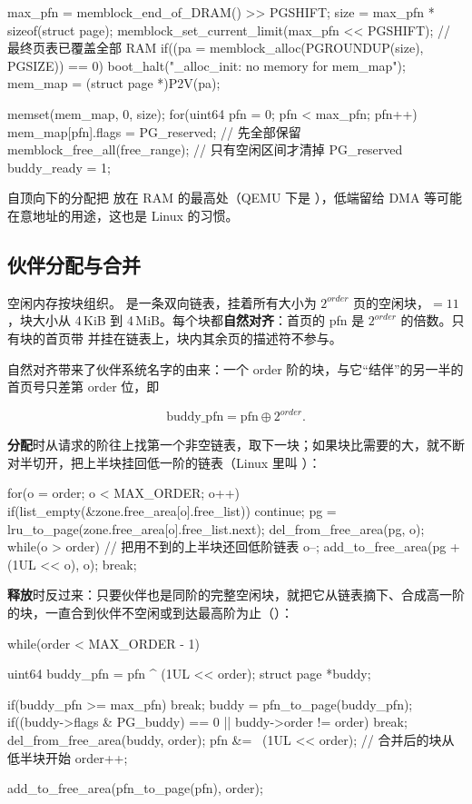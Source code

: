 \begin{ccode}
max_pfn = memblock_end_of_DRAM() >> PGSHIFT;
size = max_pfn * sizeof(struct page);
memblock_set_current_limit(max_pfn << PGSHIFT);  // 最终页表已覆盖全部 RAM
if((pa = memblock_alloc(PGROUNDUP(size), PGSIZE)) == 0)
  boot_halt("\npage_alloc_init: no memory for mem_map\n");
mem_map = (struct page *)P2V(pa);

memset(mem_map, 0, size);
for(uint64 pfn = 0; pfn < max_pfn; pfn++)
  mem_map[pfn].flags = PG_reserved;      // 先全部保留
memblock_free_all(free_range);           // 只有空闲区间才清掉 PG_reserved
buddy_ready = 1;
\end{ccode}

自顶向下的分配把  放在 RAM 的最高处（QEMU 下是 ），低端留给 DMA 等可能在意地址的用途，这也是 Linux 的习惯。

\subsection{伙伴分配与合并}

空闲内存按块组织。 是一条双向链表，挂着所有大小为 $2^{order}$ 页的空闲块，$=11$，块大小从 4\,KiB 到 4\,MiB。每个块都\textbf{自然对齐}：首页的 pfn 是 $2^{order}$ 的倍数。只有块的首页带  并挂在链表上，块内其余页的描述符不参与。

自然对齐带来了伙伴系统名字的由来：一个 order 阶的块，与它“结伴”的另一半的首页号只差第 order 位，即

\[
  \text{buddy\_pfn} = \text{pfn} \oplus 2^{order}.
\]

\textbf{分配}时从请求的阶往上找第一个非空链表，取下一块；如果块比需要的大，就不断对半切开，把上半块挂回低一阶的链表（Linux 里叫 ）：

\begin{ccode}
for(o = order; o < MAX_ORDER; o++){
  if(list_empty(&zone.free_area[o].free_list))
    continue;
  pg = lru_to_page(zone.free_area[o].free_list.next);
  del_from_free_area(pg, o);
  while(o > order){             // 把用不到的上半块还回低阶链表
    o--;
    add_to_free_area(pg + (1UL << o), o);
  }
  break;
}
\end{ccode}

\textbf{释放}时反过来：只要伙伴也是同阶的完整空闲块，就把它从链表摘下、合成高一阶的块，一直合到伙伴不空闲或到达最高阶为止（）：

\begin{ccode}
while(order < MAX_ORDER - 1){
  uint64 buddy_pfn = pfn ^ (1UL << order);
  struct page *buddy;

  if(buddy_pfn >= max_pfn)
    break;
  buddy = pfn_to_page(buddy_pfn);
  if((buddy->flags & PG_buddy) == 0 || buddy->order != order)
    break;
  del_from_free_area(buddy, order);
  pfn &= ~(1UL << order);       // 合并后的块从低半块开始
  order++;
}
add_to_free_area(pfn_to_page(pfn), order);
\end{ccode}


